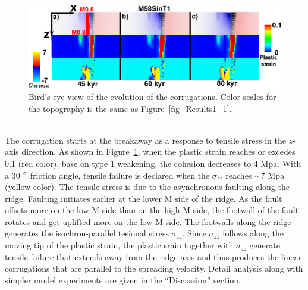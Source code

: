 \begin{figure}[h]
  \centering
    \includegraphics[width=1.0\textwidth]{./Figures/fig_Results_3_2_6_corrugations_evolution.eps}
  \caption{Bird's-eye view of the evolution of the corrugations. Color scales for the topography is the same as Figure~\hyperref[fig_Results1_1]{\ref{fig_Results1_1}}.}
 \label{fig_Results_3_2_6_corrugations_evolution}
\end{figure}

~\\
The corrugation starts at the breakaway as a response to tensile stress in the $z$-axis direction. As shown in Figure~\hyperref[fig_Results_3_2_6_corrugations_evolution]{\ref{fig_Results_3_2_6_corrugations_evolution}}, when the plastic strain reaches or excedes 0.1 (red color), base on type 1 weakening, the cohesion decreases to 4 Mpa. With a 30 $\degree$ friction angle, tensile failure is declared when the $\sigma_{zz}$ reaches $\sim$7 Mpa (yellow color).
The tensile stress is due to the asynchronous faulting along the ridge. Faulting initiates earlier at the lower M side of the ridge. As the fault offsets more on the low M side than on the high M side, the footwall of the fault rotates and get uplifted more on the low M side. The footwalls along the ridge generates the isochron-parallel tesional stress $\sigma_{zz}$. Since $\sigma_{zz}$ follows along the moving tip of the plastic strain, the plastic srain together with $\sigma_{zz}$ generate tensile failure that extends away from the ridge axis and thus produces the linear corrugations that are parallel to the spreading velocity. Detail analysis along with simpler model experiments are given in the ``Discussion'' section.   

